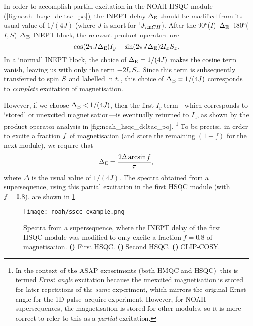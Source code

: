 In order to accomplish partial  excitation in the NOAH HSQC module (\cref{fig:noah_hsqc_deltae_po}), the INEPT delay $\Delta_{\text{E}}$ should be modified from its usual value of $1 / (4J)$ (where $J$ is short for $\oneJ{CH}$).
After the \ang{90}($I$)--$\Delta_{\text{E}}$--\ang{180}($I,S$)--$\Delta_{\text{E}}$ INEPT block, the relevant product operators are
\begin{equation}
    \label{eq:inept_changed}
    \cos(2\pi J\Delta_{\text{E}}) I_y - \sin(2\pi J\Delta_{\text{E}}) 2I_xS_z.
\end{equation}
In a `normal' INEPT block, the choice of $\Delta_{\text{E}} = 1/(4J)$ makes the cosine term vanish, leaving us with only the term $-2I_xS_z$.
Since this term is subsequently transferred to spin $S\/$ and labelled in $t_1$, this choice of $\Delta_{\text{E}} = 1/(4J)$ corresponds to \textit{complete} excitation of  magnetisation.

However, if we choose $\Delta_{\text{E}} < 1/(4J)$, then the first $I_y$ term---which corresponds to `stored' or unexcited  magnetisation---is eventually returned to $I_z$, as shown by the product operator analysis in \cref{fig:noah_hsqc_deltae_po}.%
\footnote{In the context of the ASAP experiments (both HMQC and HSQC), this is termed \textit{Ernst angle} excitation because the unexcited magnetisation is stored for later repetitions of the \textit{same} experiment, which mirrors the original Ernst angle for the 1D pulse--acquire experiment.
However, for NOAH supersequences, the magnetisation is stored for other modules, so it is more correct to refer to this as a \textit{partial} excitation.}
To be precise, in order to excite a fraction $f\/$ of  magnetisation (and store the remaining $(1 - f)$ for the next module), we require that
\begin{equation}
    \label{eq:ssc_inept_delay}
    \Delta_{\text{E}} = \frac{2\Delta \arcsin f}{\pi},
\end{equation}
where $\Delta$ is the usual value of $1/(4J)$.
The spectra obtained from a  supersequence, using this partial  excitation in the first HSQC module (with $f = 0.8$), are shown in \cref{fig:sscc_example}.

\begin{figure}[!ht]
    \centering
    \texttt{[image: noah/sscc\_example.png]}%
    {\label{fig:sscc_example_s1}}%
    {\label{fig:sscc_example_s2}}%
    {\label{fig:sscc_example_cc}}%
    \caption[Spectra from  supersequence]{
        Spectra from a  supersequence, where the INEPT delay of the first HSQC module was modified to only excite a fraction $f = 0.8$ of  magnetisation.
        \textbf{()} First HSQC.
        \textbf{()} Second HSQC.
        \textbf{()} CLIP-COSY.
    }
    \label{fig:sscc_example}
\end{figure}

